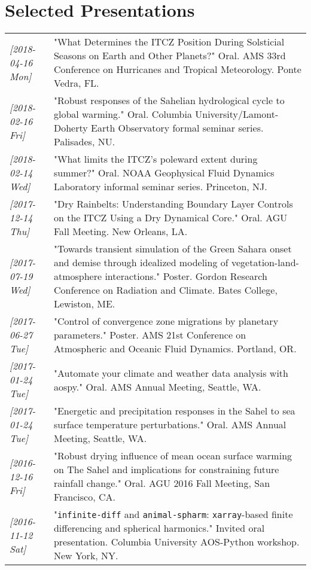 \documentclass[12pt,letterpaper]{shillcv}
\begin{document}
\section*{Selected Presentations}
\label{sec:orgbe218eb}
\begin{center}
\begin{tabularx}{\textwidth}{lX}
\textit{[2018-04-16 Mon]} & "What Determines the ITCZ Position During Solsticial Seasons on Earth and Other Planets?"  Oral.  AMS 33rd Conference on Hurricanes and Tropical Meteorology.  Ponte Vedra, FL.\\
\textit{[2018-02-16 Fri]} & "Robust responses of the Sahelian hydrological cycle to global warming."  Oral.  Columbia University/Lamont-Doherty Earth Observatory formal seminar series.  Palisades, NU.\\
\textit{[2018-02-14 Wed]} & "What limits the ITCZ's poleward extent during summer?"  Oral.  NOAA Geophysical Fluid Dynamics Laboratory informal seminar series.  Princeton, NJ.\\
\textit{[2017-12-14 Thu]} & "Dry Rainbelts: Understanding Boundary Layer Controls on the ITCZ Using a Dry Dynamical Core."  Oral.  AGU Fall Meeting.  New Orleans, LA.\\
\textit{[2017-07-19 Wed]} & "Towards transient simulation of the Green Sahara onset and demise through idealized modeling of vegetation-land-atmosphere interactions."  Poster.  Gordon Research Conference on Radiation and Climate.  Bates College, Lewiston, ME.\\
\textit{[2017-06-27 Tue]} & "Control of convergence zone migrations by planetary parameters."  Poster.  AMS 21st Conference on Atmospheric and Oceanic Fluid Dynamics.  Portland, OR.\\
\textit{[2017-01-24 Tue]} & "Automate your climate and weather data analysis with aospy."  Oral.  AMS Annual Meeting, Seattle, WA.\\
\textit{[2017-01-24 Tue]} & "Energetic and precipitation responses in the Sahel to sea surface temperature perturbations."  Oral.  AMS Annual Meeting, Seattle, WA.\\
\textit{[2016-12-16 Fri]} & "Robust drying influence of mean ocean surface warming on The Sahel and implications for constraining future rainfall change."  Oral.  AGU 2016 Fall Meeting, San Francisco, CA.\\
\textit{[2016-11-12 Sat]} & "\texttt{infinite-diff} and \texttt{animal-spharm}: \texttt{xarray}-based finite differencing and spherical harmonics."  Invited oral presentation.  Columbia University AOS-Python workshop.  New York, NY.\\

\end{tabularx}
\end{center}
\end{document}
